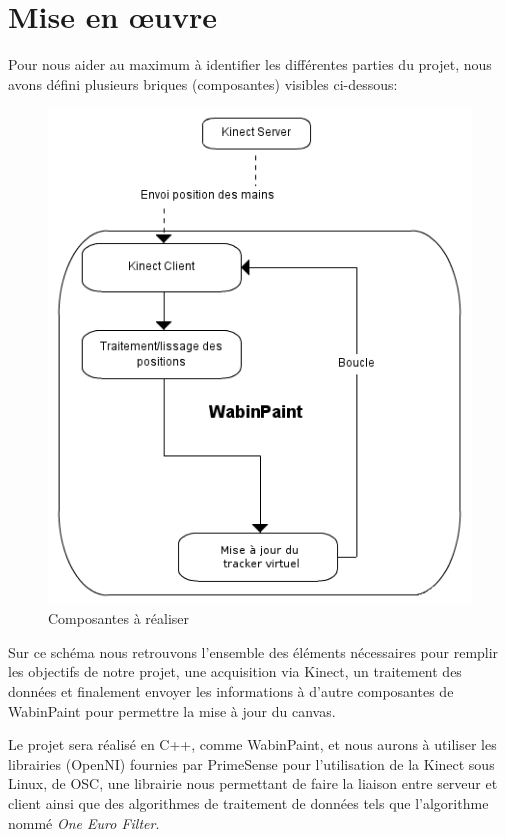  \section{Mise en œuvre}

Pour nous aider au maximum à identifier les différentes parties du projet, nous avons défini plusieurs briques (composantes) visibles ci-dessous:

\begin{figure}[!ht]
	\center
	\includegraphics[scale=0.5]{image/plan.png}
	\caption{Composantes à réaliser}
\end{figure}

Sur ce schéma nous retrouvons l'ensemble des éléments nécessaires pour remplir les objectifs de notre projet, une acquisition via Kinect, un traitement des données et finalement envoyer les informations à d'autre composantes de WabinPaint pour permettre la mise à jour du canvas.

Le projet sera réalisé en C++, comme WabinPaint, et nous aurons à utiliser les librairies (OpenNI) fournies par PrimeSense pour l'utilisation de la Kinect sous Linux, de OSC, une librairie nous permettant de faire la liaison entre serveur et client ainsi que des algorithmes de traitement de données tels que l'algorithme nommé \textit{One Euro Filter}.


